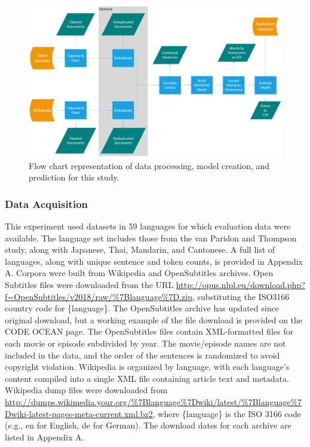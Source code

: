 \documentclass[
  english,
  man,floatsintext]{apa6}
\begin{document}
\begin{figure}
\includegraphics[width=1\linewidth]{figures/process_flow} \caption{Flow chart representation of data processing, model creation, and prediction for this study.}\label{fig:tech-details}
\end{figure}

\subsubsection{Data Acquisition}\label{data-acquisition}

This experiment used datasets in 59 languages for which evaluation data were available. The language set includes those from the van Paridon and Thompson study, along with Japanese, Thai, Mandarin, and Cantonese. A full list of languages, along with unique sentence and token counts, is provided in Appendix A. Corpora were built from Wikipedia and OpenSubtitles archives. Open Subtitles files were downloaded from the URL \url{http://opus.nlpl.eu/download.php?f=OpenSubtitles/v2018/raw/\%7Blanguage\%7D.zip}, substituting the ISO3166 country code for \{language\}. The OpenSubtitles archive has updated since original download, but a working example of the file download is provided on the CODE OCEAN page. The OpenSubtitles files contain XML-formatted files for each movie or episode subdivided by year. The movie/episode names are not included in the data, and the order of the sentences is randomized to avoid copyright violation. Wikipedia is organized by language, with each language's content compiled into a single XML file containing article text and metadata. Wikipedia dump files were downloaded from \url{http://dumps.wikimedia.your.org/\%7Blanguage\%7Dwiki/latest/\%7Blanguage\%7Dwiki-latest-pages-meta-current.xml.bz2}, where \{language\} is the ISO 3166 code (e.g., en for English, de for German). The download dates for each archive are listed in Appendix A.
\end{document}
